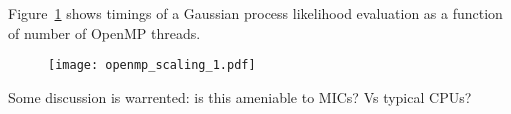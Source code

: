 Figure~\ref{fig:gp} shows timings of a Gaussian process likelihood evaluation
as a function of number of OpenMP threads.

\begin{figure}
  \texttt{[image: openmp\_scaling\_1.pdf]}
  \label{fig:gp}
\end{figure}

Some discussion is warrented: is this ameniable to MICs? Vs typical CPUs?
